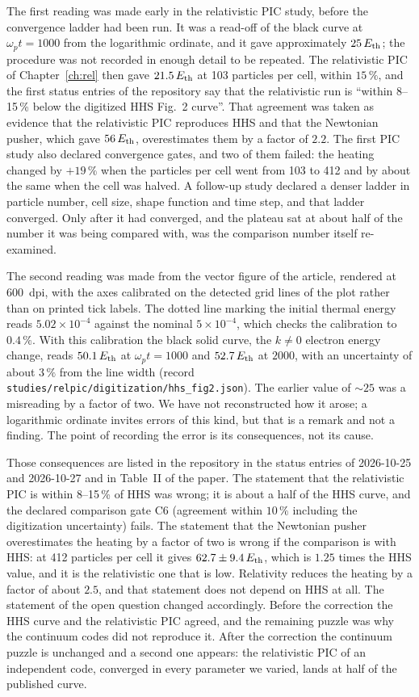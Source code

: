 The first reading was made early in the relativistic PIC study, before the convergence ladder had been run. It was a read-off of the black curve at $\omega_pt=1000$ from the logarithmic ordinate, and it gave approximately $25\,E_{\rm th}$; the procedure was not recorded in enough detail to be repeated. The relativistic PIC of Chapter~\ref{ch:rel} then gave $21.5\,E_{\rm th}$ at 103 particles per cell, within $15\,\%$, and the first status entries of the repository say that the relativistic run is ``within 8--15\,\% below the digitized HHS Fig.~2 curve''. That agreement was taken as evidence that the relativistic PIC reproduces HHS and that the Newtonian pusher, which gave $56\,E_{\rm th}$, overestimates them by a factor of $2.2$. The first PIC study also declared convergence gates, and two of them failed: the heating changed by $+19\,\%$ when the particles per cell went from 103 to 412 and by about the same when the cell was halved. A follow-up study declared a denser ladder in particle number, cell size, shape function and time step, and that ladder converged. Only after it had converged, and the plateau sat at about half of the number it was being compared with, was the comparison number itself re-examined.

The second reading was made from the vector figure of the article, rendered at 600~dpi, with the axes calibrated on the detected grid lines of the plot rather than on printed tick labels. The dotted line marking the initial thermal energy reads $5.02\times10^{-4}$ against the nominal $5\times10^{-4}$, which checks the calibration to $0.4\,\%$. With this calibration the black solid curve, the $k\neq0$ electron energy change, reads $50.1\,E_{\rm th}$ at $\omega_pt=1000$ and $52.7\,E_{\rm th}$ at $2000$, with an uncertainty of about $3\,\%$ from the line width (record \texttt{studies/relpic/digitization/hhs\_fig2.json}). The earlier value of $\sim25$ was a misreading by a factor of two. We have not reconstructed how it arose; a logarithmic ordinate invites errors of this kind, but that is a remark and not a finding. The point of recording the error is its consequences, not its cause.

Those consequences are listed in the repository in the status entries of 2026-10-25 and 2026-10-27 and in Table~II of the paper. The statement that the relativistic PIC is within 8--15\,\% of HHS was wrong; it is about a half of the HHS curve, and the declared comparison gate C6 (agreement within $10\,\%$ including the digitization uncertainty) fails. The statement that the Newtonian pusher overestimates the heating by a factor of two is wrong if the comparison is with HHS: at 412 particles per cell it gives $62.7\pm9.4\,E_{\rm th}$, which is $1.25$ times the HHS value, and it is the relativistic one that is low. Relativity reduces the heating by a factor of about $2.5$, and that statement does not depend on HHS at all. The statement of the open question changed accordingly. Before the correction the HHS curve and the relativistic PIC agreed, and the remaining puzzle was why the continuum codes did not reproduce it. After the correction the continuum puzzle is unchanged and a second one appears: the relativistic PIC of an independent code, converged in every parameter we varied, lands at half of the published curve.

